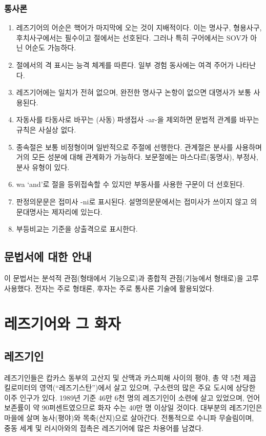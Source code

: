 \subsubsection{통사론}
\begin{enumerate}
	\item 레즈기어의 어순은 핵어가 마지막에 오는 것이 지배적이다. 이는 명사구, 형용사구, 후치사구에서는 필수이고 절에서는 선호된다. 그러나 특히 구어에서는 SOV가 아닌 어순도 가능하다.
	\item 절에서의 격 표시는 능격 체계를 따른다. 일부 경험 동사에는 여격 주어가 나타난다.
	\item 레즈기어에는 일치가 전혀 없으며, 완전한 명사구 논항이 없으면 대명사가 보통 사용된다.
	\item 자동사를 타동사로 바꾸는 (사동) 파생접사 -ar-을 제외하면 문법적 관계를 바꾸는 규칙은 사실상 없다.
	\item 종속절은 보통 비정형이며 일반적으로 주절에 선행한다. 관계절은 분사를 사용하며 거의 모든 성분에 대해 관계화가 가능하다. 보문절에는 마스다르(동명사), 부정사, 분사 유형이 있다.
	\item wa ‘and’로 절을 등위접속할 수 있지만 부동사를 사용한 구문이 더 선호된다.
	\item 판정의문문은 접미사 -ni로 표시된다. 설명의문문에서는 접미사가 쓰이지 않고 의문대명사는 제자리에 있는다.
	\item 부등비교는 기준을 상출격으로 표시한다.
\end{enumerate}
\subsection{문법서에 대한 안내}
이 문법서는 분석적 관점(형태에서 기능으로)과 종합적 관점(기능에서 형태로)을 고루 사용했다. 전자는 주로 형태론, 후자는 주로 통사론 기술에 활용되었다.

\section{레즈기어와 그 화자}
\subsection{레즈기인}
레즈기인들은 캅카스 동부의 고산지 및 산맥과 카스피해 사이의 평야, 총 약 5천 제곱킬로미터의 영역(“레즈기스탄”)에서 살고 있으며, 구소련의 많은 주요 도시에 상당한 이주 인구가 있다. 1989년 기준 46만 6천 명의 레즈기인이 소련에 살고 있었으며, 언어 보존률이 약 90퍼센트였으므로 화자 수는 40만 명 이상일 것이다. 대부분의 레즈기인은 마을에 살며 농사(평야)와 목축(산지)으로 살아간다. 전통적으로 수니파 무슬림이며, 중동 세계 및 러시아와의 접촉은 레즈기어에 많은 차용어를 남겼다.
